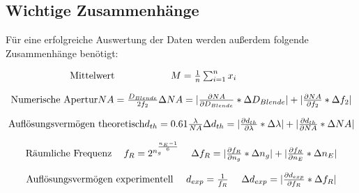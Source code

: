 \documentclass[12pt,a4paper,twoside]{article}
\begin{document}
\subsection{Wichtige Zusammenhänge}

Für eine erfolgreiche Auswertung der Daten werden außerdem folgende Zusammenhänge benötigt:

\begin{equation}
    \label{eq:avg}
    \centerline{Mittelwert \\ $M = \frac{1}{n}\sum_{i = 1}^{n} x_{i} $ \\ }
\end{equation}

\begin{equation}
    \label{eq:WZ-NA}
    \centerline{Numerische Apertur \\ $NA = \frac{D_{Blende}}{2f_{2}}$ \\ $\Delta NA = \vert \frac{\partial NA}{\partial D_{Blende}} * \Delta D_{Blende} \vert + \vert \frac{\partial NA}{\partial f_{2}} * \Delta f_{2} \vert $}
\end{equation}

\begin{equation}
    \label{eq:WZ-dTheo}
    \centerline{Auflösungsvermögen theoretisch \\ $d_{th} = 0.61\frac{\lambda}{NA}$ \\ $\Delta d_{th} = \vert \frac{\partial d_{th}}{\partial \lambda} * \Delta \lambda \vert + \vert \frac{\partial d_{th}}{\partial NA} * \Delta NA \vert $}
\end{equation}

\begin{equation}
    \label{eq:WZ-fr}
    \centerline{Räumliche Frequenz \\ $f_{R} = 2^{n_{g}^{\frac{n_{E}-1}{6}}}$ \\ $\Delta f_{R} = \vert \frac{\partial f_{R}}{\partial n_{g}} * \Delta n_{g} \vert + \vert \frac{\partial f_{R}}{\partial n_{E}} * \Delta n_{E} \vert $}
\end{equation}

\begin{equation}
    \label{eq:WZ-dExp}
    \centerline{Auflösungsvermögen experimentell \\ $d_{exp} = \frac{1}{f_{R}}$ \\ $\Delta d_{exp} = \vert \frac{\partial d_{exp}}{\partial f_{R}} * \Delta f_{R} \vert$}
\end{equation}
\end{document}
